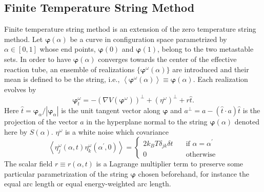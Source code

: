 \subsection{Finite Temperature String Method\label{Sec:ES:string:FTS}}
Finite temperature string method is an extension of the zero temperature string method.  Let $\boldsymbol{\varphi}(\alpha)$ be a curve in configuration space parametrized by $\alpha\in[0,1]$  whose end points, $\boldsymbol{\varphi}(0)$ and $\boldsymbol{\varphi}(1)$, belong to the two metastable sets. In order to have $\boldsymbol{\varphi}(\alpha)$ converges towards the center of the effective reaction tube, an ensemble of realizations $\{\boldsymbol{\varphi}^\omega(\alpha)\}$ are introduced and their mean is defined to be the string, i.e., $\left<\boldsymbol{\varphi}^\omega(\alpha)\right>\equiv \boldsymbol{\varphi}(\alpha)$.
Each realization evolves by
\begin{equation}
	\boldsymbol{\varphi}^\omega_t=-\left(\nabla V(\boldsymbol{\varphi}^\omega)\right)^{\perp}+\left(\eta^\omega\right)^{\perp}+r\hat{t}.
    \label{Eq:ES:string:FTTS:evolving}
\end{equation}
Here $\hat{t}=\boldsymbol{\varphi}_\alpha/|\boldsymbol{\varphi}_\alpha|$ is the unit tangent vector along $\boldsymbol{\varphi}$ and $a^\perp=a-(\hat{t}\cdot a)\hat{t}$ is the projection of the vector $a$ in the hyperplane normal to the string $\boldsymbol{\varphi}(\alpha)$ denoted here by $S(\alpha)$. $\eta^\omega$ is a white noise which covariance
\begin{equation}
	\left<\eta_j^{\omega}(\alpha,t)\eta_k^\omega(\alpha^\prime,0)\right> =
	\begin{cases}
		2k_BT\delta_{jk}\delta{t}       & \quad \text{if } \alpha=\alpha^\prime\\
		0                               & \quad \text{otherwise}
	\end{cases}
\end{equation}
The scalar field $r\equiv r(\alpha,t)$ is a Lagrange multiplier term to preserve some particular parametrization of the string $\boldsymbol{\varphi}$ chosen beforehand, for instance the equal arc length or equal energy-weighted arc length.

